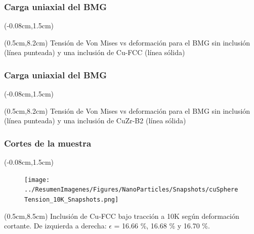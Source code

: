 \begin{frame}
 \frametitle{Carga uniaxial del BMG}
  \begin{textblock*}{12.6cm}(-0.08cm,1.5cm) 
      \begin{figure}[htp]
	\centering
      \end{figure}
    \end{textblock*}
    \begin{textblock*}{12cm}(0.5cm,8.2cm) 
    \centering
      Tensi\'on de Von Mises vs deformaci\'on para el BMG sin inclusi\'on (l\'inea punteada) y una inclusi\'on de Cu-FCC (l\'inea s\'olida)
    \end{textblock*}
\end{frame}
\begin{frame}
  \frametitle{Carga uniaxial del BMG}
    \begin{textblock*}{12.6cm}(-0.08cm,1.5cm) 
      \begin{figure}[htp]
	\centering
      \end{figure}
    \end{textblock*}
    \begin{textblock*}{12cm}(0.5cm,8.2cm) 
    \centering
      Tensi\'on de Von Mises vs deformaci\'on para el BMG sin inclusi\'on (l\'inea punteada) y una inclusi\'on de CuZr-B2 (l\'inea s\'olida)
    \end{textblock*}
\end{frame}

\begin{frame}
  \frametitle{Cortes de la muestra}
  \begin{textblock*}{12.6cm}(-0.08cm,1.5cm) 
    \begin{figure}[htp]
     \centering
     \texttt{[image: ../ResumenImagenes/Figures/NanoParticles/Snapshots/cuSphereTension\_10K\_Snapshots.png]}
    \end{figure}
  \end{textblock*}
  \begin{textblock*}{12cm}(0.5cm,8.5cm) 
    \centering
      \small{Inclusi\'on de Cu-FCC bajo tracci\'on a 10K según deformaci\'on cortante. De izquierda a derecha: $\epsilon$ = 16.66 \%, 16.68 \% y 16.70 \%.}
    \end{textblock*}
    
\end{frame}

